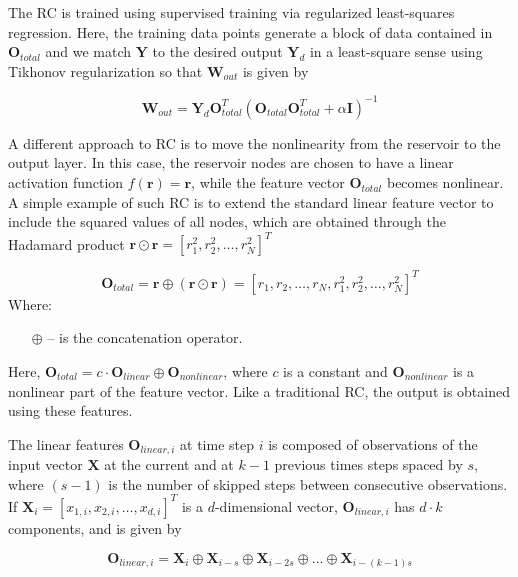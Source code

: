 \documentclass[11pt, oneside]{article}
\begin{document}
The RC is trained using supervised training via regularized least-squares regression. Here, the training data points generate a block of data contained in \(\mathbf{O}_{total}\) and we match \(\mathbf{Y}\) to the desired output \(\mathbf{Y}_d\) in a least-square sense using Tikhonov regularization so that \(\mathbf{W}_{out}\) is given by

\begin{equation}
    \mathbf{W}_{out} = \mathbf{Y}_d \mathbf{O}_{total}^T (\mathbf{O}_{total} \mathbf{O}_{total}^T + \alpha \mathbf{I})^{-1}
\end{equation}

A different approach to RC is to move the nonlinearity from the reservoir to the output layer. In this case, the reservoir nodes are chosen to have a linear activation function \(f(\mathbf{r}) = \mathbf{r}\), while the feature vector \(\mathbf{O}_{total}\) becomes nonlinear. A simple example of such RC is to extend the standard linear feature vector to include the squared values of all nodes, which are obtained through the Hadamard product \( \mathbf{r} \odot \mathbf{r} =  [r_1^2, r_2^2, \ldots, r_N^2]^T \)

\begin{equation}
    \mathbf{O}_{total} = \mathbf{r} \oplus (\mathbf{r} \odot \mathbf{r}) = [r_1, r_2, \ldots, r_N, r_1^2, r_2^2, \ldots, r_N^2]^T
\end{equation}
Where:
\begin{itemize}[noitemsep, leftmargin=4cm, label={}]
    \item [\(\oplus\)] -- is the concatenation operator.
    
\end{itemize}
Here, \(\mathbf{O}_{total} = c \cdot \mathbf{O}_{linear} \oplus \mathbf{O}_{nonlinear}\), where \(c\) is a constant
and \(\mathbf{O}_{nonlinear}\) is a nonlinear part of the feature vector. Like a traditional RC, the output is obtained using these features.

The linear features \(\mathbf{O}_{linear,i}\) at time step \(i\) is composed of observations of the input vector \(\mathbf{X}\) at the current and at \(k-1\) previous times steps spaced by \(s\), where \((s-1)\) is the number of skipped steps between consecutive observations. If \(\mathbf{X}_i = [x_{1,i}, x_{2,i}, \ldots, x_{d,i}]^T\) is a \(d\)-dimensional vector, \(\mathbf{O}_{linear,i}\) has \(d \cdot k\) components, and is given by

\begin{equation}
    \mathbf{O}_{linear,i} = \mathbf{X}_i \oplus \mathbf{X}_{i-s} \oplus \mathbf{X}_{i-2s} \oplus \ldots \oplus \mathbf{X}_{i-(k-1)s}
\end{equation}
\end{document}
